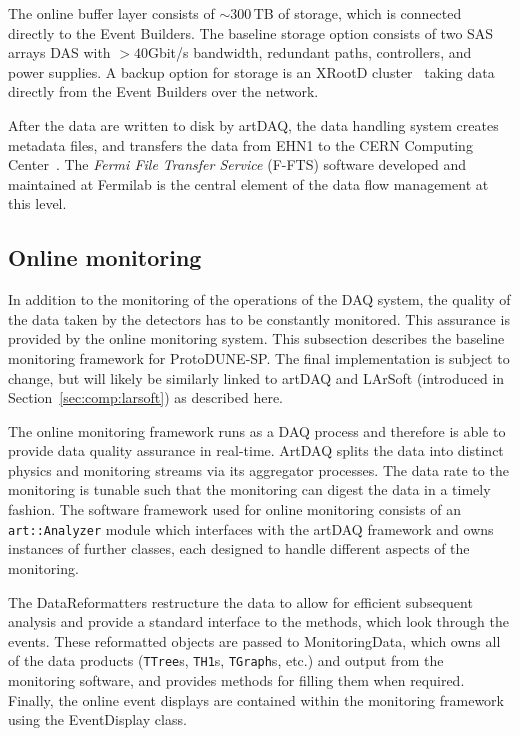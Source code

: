 The online buffer layer consists of $\sim$300\,TB of storage,
which is connected directly to the Event Builders.  The baseline
storage option consists of two SAS arrays DAS with $>40$Gbit/s bandwidth,
redundant paths, controllers, and power supplies.
A backup option for storage is an XRootD cluster~\cite{xrootd} taking
data directly from the Event Builders over the network.

After the data are written to disk by artDAQ, the data handling
system creates metadata files, and
transfers the data from EHN1 to the CERN Computing Center~\cite{docdb1212}.
The \textit{Fermi File Transfer Service} (F-FTS) software 
developed and maintained at Fermilab is the central element
of the data flow management at this level.


\subsection{Online monitoring}
\label{sec:daq_online_monitoring}

In addition to the monitoring of the operations of the DAQ system, the
quality of the data taken by the detectors has to be constantly monitored.
This assurance is provided by the online monitoring system.
This subsection describes the baseline monitoring framework for ProtoDUNE-SP.  
The final implementation is subject to change, but will likely be similarly
linked to artDAQ and LArSoft (introduced in Section~\ref{sec:comp:larsoft}) as described here.

The online monitoring framework runs as a DAQ process and therefore is
able to provide data quality assurance in real-time. ArtDAQ splits the  
data into distinct physics and monitoring streams via its aggregator processes.  
The data rate to the monitoring is tunable such that the monitoring 
can digest the data in a timely fashion.
The software framework used for online monitoring 
consists of an
\texttt{art::Analyzer} module which interfaces with the artDAQ framework and
owns instances of further classes, each designed to handle different aspects
of the monitoring.  

The DataReformatters restructure the data to allow for efficient subsequent
analysis and provide a standard interface to the methods, which look through
the events.  These reformatted objects are passed to MonitoringData, which
owns all of the data products (\texttt{TTree}s, \texttt{TH1}s, \texttt{TGraph}s,
etc.) and output from the monitoring software, and provides methods for filling
them when required.  Finally, the online event displays are
contained within the monitoring framework using the EventDisplay class.

